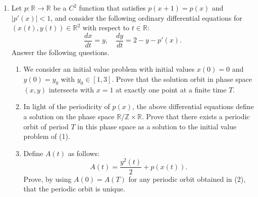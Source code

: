 \documentclass{article}
\begin{document}
\begin{enumerate}[label=\fbox{\arabic*}]
  \item Let $p: \mathbb{R} \to \mathbb{R}$ be a $C^2$ function that satisfies $p(x+1) = p(x)$ and $|p'(x)| < 1$, and consider the following ordinary differential equations for $(x(t), y(t)) \in \mathbb{R}^2$ with respect to $t \in \mathbb{R}$:
        \[
          \frac{dx}{dt} = y, \quad \frac{dy}{dt} = 2 - y - p'(x).
        \]
        Answer the following questions.
        \begin{enumerate}[label=(\arabic*)]
          \item We consider an initial value problem with initial values $x(0) = 0$ and $y(0) = y_0$ with $y_0 \in [1, 3]$. Prove that the solution orbit in phase space $(x, y)$ intersects with $x = 1$ at exactly one point at a finite time $T$.
          \item In light of the periodicity of $p(x)$, the above differential equations define a solution on the phase space $\mathbb{R}/\mathbb{Z} \times \mathbb{R}$. Prove that there exists a periodic orbit of period $T$ in this phase space as a solution to the initial value problem of (1).
          \item Define $A(t)$ as follows:
                \[
                  A(t) = \frac{y^2(t)}{2} + p(x(t)).
                \]
                Prove, by using $A(0) = A(T)$ for any periodic orbit obtained in (2), that the periodic orbit is unique.
        \end{enumerate}


\end{enumerate}
\end{document}
